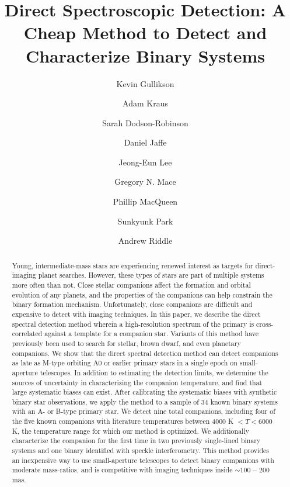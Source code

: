 \documentclass{emulateapj}
\begin{document}
\title{Direct Spectroscopic Detection: A Cheap Method to Detect and Characterize Binary Systems}

\author{Kevin Gullikson }
\author{Adam Kraus }
\author{Sarah Dodson-Robinson }
\author{Daniel Jaffe }
\author{Jeong-Eun Lee }
\author{Gregory N. Mace }
\author{Phillip MacQueen }
\author{Sunkyunk Park }
\author{Andrew Riddle }




\begin{abstract}
Young, intermediate-mass stars are experiencing renewed interest as targets for direct-imaging planet searches. However, these types of stars are part of multiple systems more often than not. Close stellar companions affect the formation and orbital evolution of any planets, and the properties of the companions can help constrain the binary formation mechanism. Unfortunately, close companions are difficult and expensive to detect with imaging techniques. In this paper, we describe the direct spectral detection method wherein a high-resolution spectrum of the primary is cross-correlated against a template for a companion star. Variants of this method have previously been used to search for stellar, brown dwarf, and even planetary companions. We show that the direct spectral detection method can detect companions as late as M-type orbiting A0 or earlier primary stars in a single epoch on small-aperture telescopes. In addition to estimating the detection limits, we determine the sources of uncertainty in characterizing the companion temperature, and find that large systematic biases can exist. After calibrating the systematic biases with synthetic binary star observations, we apply the method to a sample of 34 known binary systems with an A- or B-type primary star. We detect nine total companions, including four of the five known companions with literature temperatures between $4000$ K $ < T < 6000$ K, the temperature range for which our method is optimized. We additionally characterize the companion for the first time in two previously single-lined binary systems and one binary identified with speckle interferometry. This method provides an inexpensive way to use small-aperture telescopes to detect binary companions with moderate mass-ratios, and is competitive with imaging techniques inside $\sim 100-200$ mas.
\end{abstract}
\end{document}
